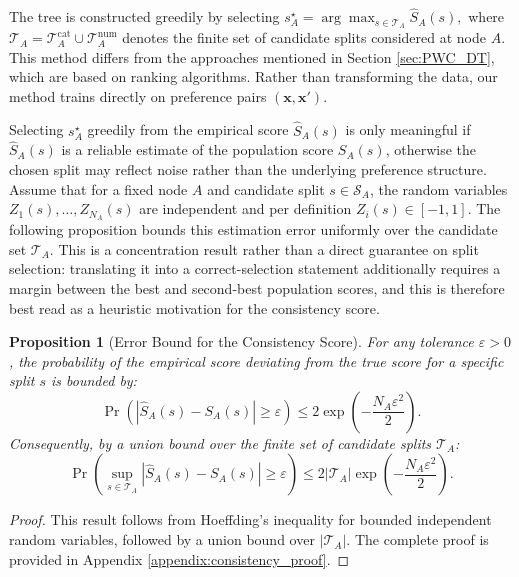 \documentclass{article}
\newtheorem{proposition}{Proposition}
\begin{document}
The tree is constructed greedily by selecting
$
s_A^\star = \arg\max_{s\in\mathcal{T}_A} \widehat S_A(s),
$
where $\mathcal{T}_A = \mathcal{T}_A^{\text{cat}} \cup \mathcal{T}_A^{\text{num}}$ denotes the finite set of candidate splits considered at node $A$. This method differs from the approaches mentioned in Section \ref{sec:PWC_DT}, which are based on ranking algorithms. Rather than transforming the data, our method trains directly on preference pairs $(\mathbf{x}, \mathbf{x}')$. 

 Selecting $s_A^\star$ greedily from the empirical score $\widehat S_A(s)$ is only meaningful if $\widehat S_A(s)$ is a reliable estimate of the population score $S_A(s)$, otherwise the chosen split may reflect noise rather than the underlying preference structure. Assume that for a fixed node $A$ and candidate split $s\in\mathcal S_A$, the random variables
$Z_1(s),\dots,Z_{N_A}(s)$ are independent and per definition $Z_i(s)\in[-1,1]$. The following proposition bounds this estimation error uniformly over the candidate set $\mathcal{T}_A$. This is a concentration result rather than a direct guarantee on split selection: translating it into a correct-selection statement additionally requires a margin between the best and second-best population scores, and this is therefore best read as a heuristic motivation for the consistency score.
\begin{proposition}[Error Bound for the Consistency Score]\label{prop:consistency_bound}
For any tolerance $\varepsilon>0$, the probability of the empirical score deviating from the true score for a specific split $s$ is bounded by:
\[
\Pr\!\left(
\left|
\widehat S_A(s)-S_A(s)
\right|
\ge \varepsilon
\right)
\le
2\exp\!\left(-\frac{N_A\varepsilon^2}{2}\right).
\]
Consequently, by a union bound over the finite set of candidate splits $\mathcal{T}_A$:
\[
\Pr\!\left(
\sup_{s\in\mathcal{T}_A}
\left|
\widehat S_A(s)-S_A(s)
\right|
\ge \varepsilon
\right)
\le
2|\mathcal{T}_A|
\exp\!\left(-\frac{N_A\varepsilon^2}{2}\right).
\]
\end{proposition}
\begin{proof} This result follows from Hoeffding's inequality for bounded independent random variables, followed by a union bound over $|\mathcal{T}_A|$. The complete proof is provided in Appendix \ref{appendix:consistency_proof}. \end{proof}
\end{document}
